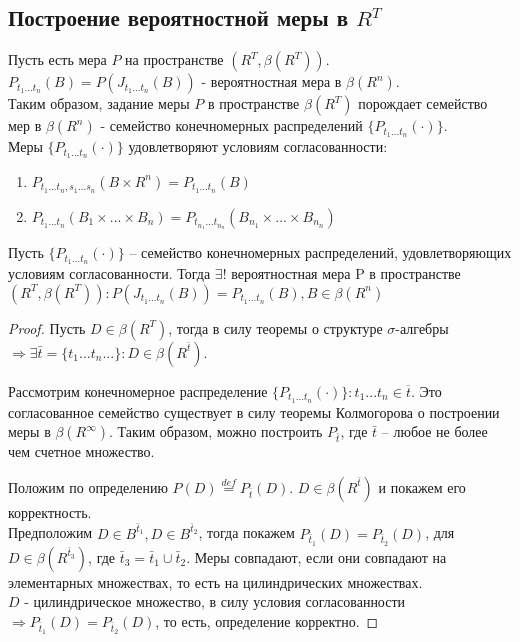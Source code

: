 \subsection{Построение вероятностной меры в $R^T$}
Пусть есть мера $P$ на пространстве $(R^T, \beta (R^T))$.\\
$P_{t_{1}...t_{n}}(B) = P(J_{t_{1}...t_{n}}(B))$ - вероятностная мера в $\beta (R^{n})$.\\
Таким образом, задание меры $P$ в пространстве $\beta (R^{T})$ порождает семейство мер в $\beta (R^{n})$ - семейство конечномерных распределений $\{P_{t_{1}...t_{n}} (\cdot)\}$.\\
Меры $\{P_{t_{1}...t_{n}}(\cdot)\}$ удовлетворяют условиям согласованности:
\begin{enumerate}
\item $P_{t_{1}...t_{n}, s_{1}...s_{n}} (B\times R^{n}) = P_{t_{1}...t_{n}}(B)$
\item $P_{t_{1}...t_{n}}(B_{1}\times ... \times B_{n}) = P_{t_{n_{1}}...t_{n_{n}}}(B_{n_{1}}\times ... \times B_{n_{n}})$
\end{enumerate}
\begin{theorem}
Пусть $\{P_{t_{1}...t_{n}}(\cdot)\}$ -- семейство конечномерных распределений, удовлетворяющих условиям согласованности. Тогда $\exists !$  вероятностная мера P в пространстве $(R^{T}, \beta (R^{T})): P(J_{t_{1}...t_{n}}(B)) = P_{t_{1}...t_{n}}(B), B\in \beta (R^{n})$
\end{theorem}
\begin{proof}
Пусть $D\in \beta(R^{T})$, тогда в силу теоремы о структуре $\sigma$-алгебры $\Rightarrow\exists\bar{t} = \{t_{1}...t_{n}...\}: D\in \beta(R^{\bar{t}})$.

Рассмотрим конечномерное распределение $\{P_{t_{1}...t_{n}}(\cdot)\} :t_{1}...t_{n}\in \overline{t}$. Это согласованное семейство существует в силу теоремы Колмогорова о построении меры в $\beta(R^{\infty})$. Таким образом, можно построить $P_{\bar{t}}$, где $\bar{t}$ -- любое не более чем счетное множество.

Положим по определению $P(D)\stackrel{def}{=}P_{\bar{t}}(D)$. $D\in \beta(R^{\bar{t}})$ и покажем его корректность.\\
Предположим $D\in B^{\bar{t}_1}, D\in B^{\bar{t}_2}$, тогда покажем $P_{\bar{t}_1}(D) = P_{\bar{t}_2}(D)$, для $D\in \beta(R^{\bar{t}_3})$, где $\bar{t}_3 = \bar{t}_1 \cup \bar{t}_2$. Меры совпадают, если они совпадают на элементарных множествах, то есть на цилиндрических множествах.\\
$D$ - цилиндрическое множество, в силу условия согласованности $\Rightarrow P_{\bar{t}_1}(D) = P_{\bar{t}_2}(D)$, то есть, определение корректно.
\end{proof}
